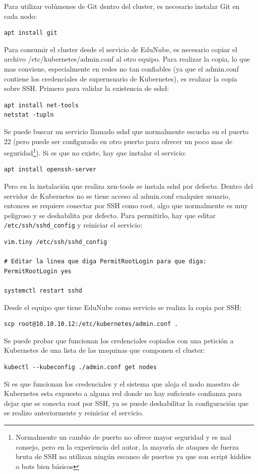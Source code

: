 Para utilizar volúmenes de Git dentro del cluster, es necesario instalar Git en cada nodo:
\begin{lstlisting}
apt install git
\end{lstlisting}

Para consumir el cluster desde el servicio de EduNube, es necesario copiar el archivo /etc/kubernetes/admin.conf al otro equipo. Para realizar la copia, lo que mas conviene, especialmente en redes no tan confiables (ya que el admin.conf contiene los credenciales de superusuario de Kubernetes), es realizar la copia sobre SSH. Primero para validar la existencia de sshd:
\begin{lstlisting}
apt install net-tools
netstat -tupln
\end{lstlisting}
Se puede buscar un servicio llamado sshd que normalmente escucha en el puerto 22 (pero puede ser configurado en otro puerto para ofrecer un poco mas de seguridad\footnote{Normalmente un cambio de puerto no ofrece mayor seguridad y es mal consejo, pero en la experiencia del autor, la mayoría de ataques de fuerza bruta de SSH no utilizan ningún escaneo de puertos ya que son script kiddies o bots bien básicos}). Si es que no existe, hay que instalar el servicio:
\begin{lstlisting}
apt install openssh-server
\end{lstlisting}
Pero en la instalación que realiza xen-tools se instala sshd por defecto. Dentro del servidor de Kubernetes no se tiene acceso al admin.conf cualquier usuario, entonces se requiere conectar por SSH como root, algo que normalmente es muy peligroso y se deshabilita por defecto. Para permitirlo, hay que editar \texttt{/etc/ssh/sshd\_config} y reiniciar el servicio:
\begin{lstlisting}
vim.tiny /etc/ssh/sshd_config

# Editar la linea que diga PermitRootLogin para que diga:
PermitRootLogin yes

systemctl restart sshd
\end{lstlisting}

Desde el equipo que tiene EduNube como servicio se realiza la copia por SSH:
\begin{lstlisting}
scp root@10.10.10.12:/etc/kubernetes/admin.conf .
\end{lstlisting}
Se puede probar que funcionan los credenciales copiados con una petición a Kubernetes de una lista de las maquinas que componen el cluster:
\begin{lstlisting}
kubectl --kubeconfig ./admin.conf get nodes
\end{lstlisting}
Si es que funcionan los credenciales y el sistema que aloja el nodo maestro de Kubernetes esta expuesto a alguna red donde no hay suficiente confianza para dejar que se conecta root por SSH, ya se puede deshabilitar la configuración que se realizo anteriormente y reiniciar el servicio.
\citep{kubernetes-create-cluster-kubeadm}

